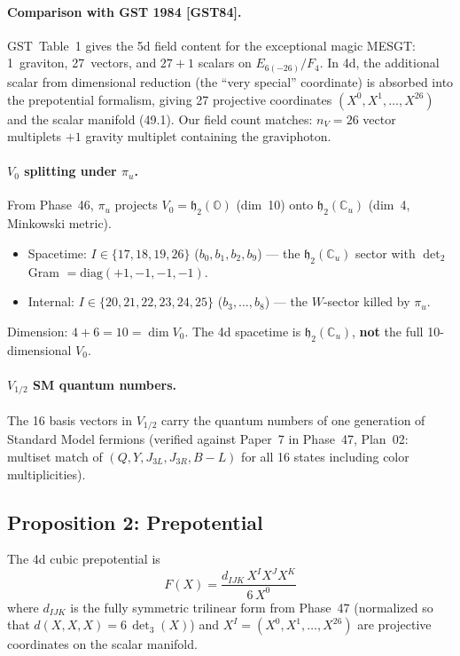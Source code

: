 \paragraph{Comparison with GST 1984 [GST84].}
GST~Table~1 gives the 5d field content for the exceptional magic MESGT:
1~graviton, 27~vectors, and $27 + 1$ scalars on
$E_{6(-26)}/F_4$.
In 4d, the additional scalar from dimensional reduction
(the ``very special'' coordinate) is absorbed into the prepotential
formalism, giving 27 projective coordinates
$(X^0, X^1, \ldots, X^{26})$ and the scalar manifold (49.1).
Our field count matches: $n_V = 26$ vector multiplets $+ 1$ gravity
multiplet containing the graviphoton.

\paragraph{$V_0$ splitting under $\pi_u$.}
From Phase~46, $\pi_u$ projects $V_0 = \mathfrak{h}_2(\mathbb{O})$
(dim~10) onto $\mathfrak{h}_2(\mathbb{C}_u)$ (dim~4, Minkowski metric).
\begin{itemize}
\item Spacetime: $I \in \{17, 18, 19, 26\}$ ($b_0, b_1, b_2, b_9$) ---
  the $\mathfrak{h}_2(\mathbb{C}_u)$ sector with
  $\det_2$ Gram $= \mathrm{diag}(+1, -1, -1, -1)$.
\item Internal: $I \in \{20, 21, 22, 23, 24, 25\}$ ($b_3, \ldots, b_8$)
  --- the $W$-sector killed by $\pi_u$.
\end{itemize}
Dimension: $4 + 6 = 10 = \dim V_0$. The 4d spacetime is
$\mathfrak{h}_2(\mathbb{C}_u)$, \textbf{not} the full 10-dimensional
$V_0$.

\paragraph{$V_{1/2}$ SM quantum numbers.}
The 16 basis vectors in $V_{1/2}$ carry the quantum numbers of one
generation of Standard Model fermions (verified against Paper~7 in
Phase~47, Plan~02: multiset match of $(Q, Y, J_{3L}, J_{3R}, B{-}L)$
for all 16 states including color multiplicities).


\subsection*{Proposition 2: Prepotential}

The 4d cubic prepotential is
\begin{equation}\tag{49.2}
  F(X) = \frac{d_{IJK}\, X^I X^J X^K}{6\, X^0}
\end{equation}
where $d_{IJK}$ is the fully symmetric trilinear form from Phase~47
(normalized so that $d(X, X, X) = 6\,\det_3(X)$) and $X^I = (X^0, X^1,
\ldots, X^{26})$ are projective coordinates on the scalar manifold.

